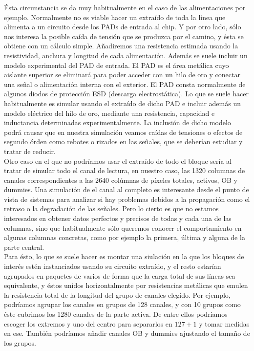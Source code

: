 Ésta circunstancia se da muy habitualmente en el caso de las alimentaciones por ejemplo.
Normalmente no es viable hacer un extraído de toda la línea que alimenta a un circuito
desde los PADs de entrada al chip. Y por otro lado, sólo nos interesa la posible
caída de tensión que se produzca por el camino, y ésta se obtiene con un cálculo
simple. Añadiremos una resistencia estimada usando la resistividad, anchura y longitud
de cada alimentación. Además se suele incluir un modelo experimental del PAD de entrada.
El PAD es el área metálica cuyo aislante superior se eliminará para poder acceder
con un hilo de oro y conectar una señal o alimentación interna con el exterior.
El PAD consta normalmente de algunos diodos de protección ESD (descarga electrostática).
Lo que se suele hacer habitualmente es simular usando el extraído de dicho PAD e
incluir además un modelo eléctrico del hilo de oro, mediante una resistencia,
capacidad e inductancia determinadas experimentalmente. La inclusión de dicho modelo
podrá causar que en nuestra simulación veamos caídas de tensiones o efectos de
segundo órden como rebotes o rizados en las señales, que se deberían estudiar y
tratar de reducir.\\

Otro caso en el que no podríamos usar el extraído de todo el bloque sería al tratar
de simular todo el canal de lectura, en nuestro caso, las 1320 columnas de canales
correspondientes a las 2640 colúmnas de píxeles totales, activos, OB y dummies.
Una simulación de el canal al completo es interesante desde el punto de vista de
sistemas para analizar si hay problemas debidos a la propagación como el retraso
o la degradación de las señales. Pero lo cierto es que no estamos interesados
en obtener datos perfectos y precisos de todas y cada una de las columnas, sino que
habitualmente sólo queremos conocer el comportamiento en algunas columnas concretas,
como por ejemplo la primera, última y alguna de la parte central.\\

Para ésto, lo que se suele hacer es montar una siulación en la que los bloques
de interés estén instanciados usando su circuito extraído, y el resto estarían
agrupados en paquetes de varios de forma que la carga total de sus líneas sea
equivalente, y éstos unidos horizontalmente por resistencias metálicas que
emulen la resistencia total de la longitud del grupo de canales elegido. Por
ejemplo, podríamos agrupar los canales en grupos de 128 canales, y con 10 grupos
como éste cubrimos los 1280 canales de la parte activa. De entre ellos podríamos
escoger los extremos y uno del centro para separarlos en $127 + 1$ y tomar medidas
en ese. También podríamos añadir canales OB y dummies ajustando el tamaño de los
grupos.\\

